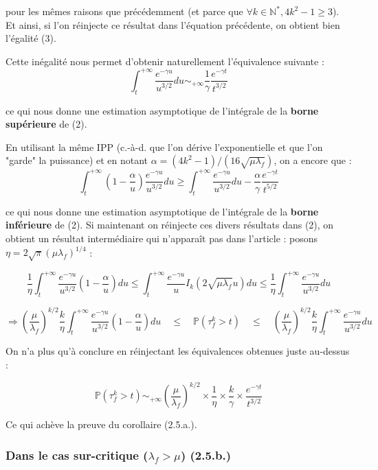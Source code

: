 \documentclass[12pt,a4paper]{article}
\begin{document}
pour les mêmes raisons que précédemment (et parce que $ \forall k \in \mathbb{N}^*, 4k^2-1 \geq 3 $). Et ainsi, si l'on réinjecte ce résultat dans l'équation précédente, on obtient bien l'égalité (3). 

Cette inégalité nous permet d'obtenir naturellement l'équivalence suivante : $$ \boxed{\int_t^{+\infty} \frac{e^{-\gamma u}}{u^{3/2}} du \sim_{+\infty} \frac{1}{\gamma} \frac{e^{-\gamma t}}{t^{3/2}}} $$

ce qui nous donne une estimation asymptotique de l'intégrale de la \textbf{borne supérieure} de (2).

En utilisant la même IPP (c.-à-d. que l'on dérive l'exponentielle et que l'on "garde" la puissance) et en notant $\alpha = (4k^2-1)/(16\sqrt{\mu \lambda_f})$, on a encore que :
$$ \int_t^{+\infty} (1-\frac{\alpha}{u}) \frac{e^{-\gamma u}}{u^{3/2}} du \geq \int_t^{+\infty} \frac{e^{-\gamma u}}{u^{3/2}} du - \frac{\alpha}{\gamma} \frac{e^{-\gamma t}}{t^{5/2}}$$

ce qui nous donne une estimation asymptotique de l'intégrale de la \textbf{borne inférieure}  de (2). Si maintenant on réinjecte ces divers résultats dans (2), on obtient un résultat intermédiaire qui n'apparaît pas dans l'article : posons $\eta = 2\sqrt{\pi} (\mu \lambda_f)^{1/4}$ :

$$ \frac{1}{\eta} \int_t^{+\infty} \frac{e^{-\gamma u}}{u^{3/2}} ( 1 - \frac{\alpha}{u}) du \leq \int_t^{+\infty} \frac{e^{-\gamma u}}{u} I_k(2\sqrt{\mu \lambda_f} u) du \leq \frac{1}{\eta} \int_t^{+\infty}  \frac{e^{-\gamma u}}{u^{3/2}} du $$

$$ \Rightarrow \left(\frac{\mu}{\lambda_f}\right)^{k/2} \frac{k}{\eta} \int_t^{+\infty} \frac{e^{-\gamma u}}{u^{3/2}} ( 1 - \frac{\alpha}{u}) du \quad \leq \quad \mathbb{P}(\tau_f^k > t) \quad \leq \quad \left(\frac{\mu}{\lambda_f}\right)^{k/2}  \frac{k}{\eta} \int_t^{+\infty}  \frac{e^{-\gamma u}}{u^{3/2}} du $$

On n'a plus qu'à conclure en réinjectant les équivalences obtenues juste au-dessus :

$$ \boxed{\mathbb{P}(\tau_f^k > t) \sim_{+\infty} \left(\frac{\mu}{\lambda_f}\right)^{k/2} \times \frac{1}{\eta} \times \frac{k}{\gamma} \times \frac{e^{-\gamma t}}{t^{3/2}}} $$ 

Ce qui achève la preuve du corollaire (2.5.a.).

\subsubsection{Dans le cas sur-critique (\texorpdfstring{$\lambda_f > \mu$}{}) (2.5.b.)}
\end{document}
